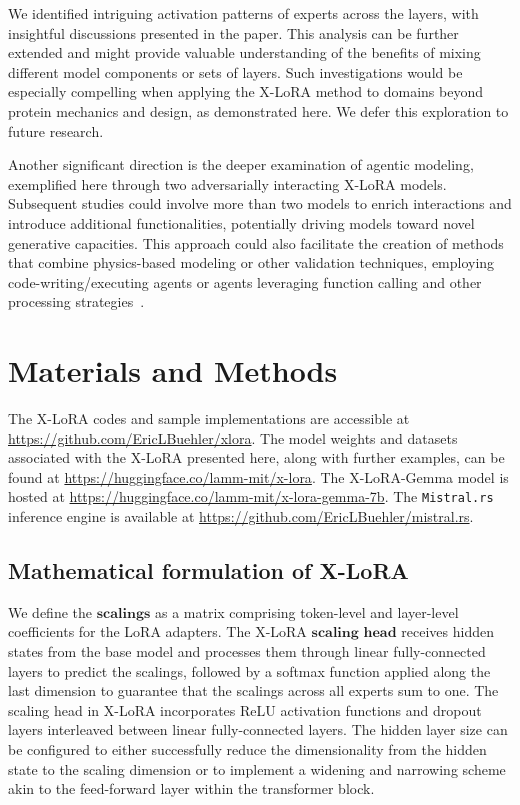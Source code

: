 We identified intriguing activation patterns of experts across the layers, with insightful discussions presented in the paper. This analysis can be further extended and might provide valuable understanding of the benefits of mixing different model components or sets of layers. Such investigations would be especially compelling when applying the X-LoRA method to domains beyond protein mechanics and design, as demonstrated here. We defer this exploration to future research.

Another significant direction is the deeper examination of agentic modeling, exemplified here through two adversarially interacting X-LoRA models. Subsequent studies could involve more than two models to enrich interactions and introduce additional functionalities, potentially driving models toward novel generative capacities. This approach could also facilitate the creation of methods that combine physics-based modeling or other validation techniques, employing code-writing/executing agents or agents leveraging function calling and other processing strategies~\cite{Ghafarollahi2024ProtAgents:Learning}.

\section{Materials and Methods}

The X-LoRA codes and sample implementations are accessible at \url{https://github.com/EricLBuehler/xlora}. The model weights and datasets associated with the X-LoRA presented here, along with further examples, can be found at \url{https://huggingface.co/lamm-mit/x-lora}. The X-LoRA-Gemma model is hosted at \url{https://huggingface.co/lamm-mit/x-lora-gemma-7b}. The \texttt{Mistral.rs} inference engine is available at \url{https://github.com/EricLBuehler/mistral.rs}.

\subsection{Mathematical formulation of X-LoRA} We define the $\mathbf{scalings}$ as a matrix comprising token-level and layer-level coefficients for the LoRA adapters. The X-LoRA $\mathbf{scaling}$ $\mathbf{head}$ receives hidden states from the base model and processes them through linear fully-connected layers to predict the scalings, followed by a softmax function applied along the last dimension to guarantee that the scalings across all experts sum to one. The scaling head in X-LoRA incorporates ReLU activation functions and dropout layers interleaved between linear fully-connected layers. The hidden layer size can be configured to either successfully reduce the dimensionality from the hidden state to the scaling dimension or to implement a widening and narrowing scheme akin to the feed-forward layer within the transformer block.

